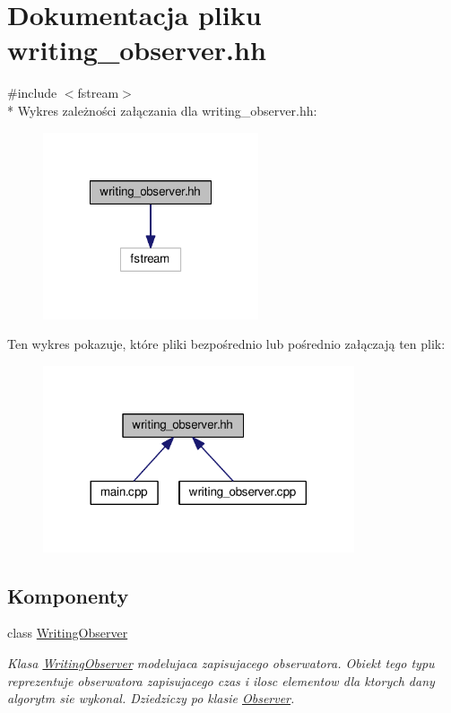 \hypertarget{writing__observer_8hh}{\section{Dokumentacja pliku writing\-\_\-observer.\-hh}
\label{writing__observer_8hh}
}
{\ttfamily \#include $<$fstream$>$}\\*
Wykres zależności załączania dla writing\-\_\-observer.\-hh\-:
\nopagebreak
\begin{figure}[H]
\begin{center}
\leavevmode
\includegraphics[width=180pt]{writing__observer_8hh__incl}
\end{center}
\end{figure}
Ten wykres pokazuje, które pliki bezpośrednio lub pośrednio załączają ten plik\-:
\nopagebreak
\begin{figure}[H]
\begin{center}
\leavevmode
\includegraphics[width=260pt]{writing__observer_8hh__dep__incl}
\end{center}
\end{figure}
\subsection*{Komponenty}
\begin{DoxyCompactItemize}
\item 
class \hyperlink{class_writing_observer}{Writing\-Observer}
\begin{DoxyCompactList}\small\item\em Klasa \hyperlink{class_writing_observer}{Writing\-Observer} modelujaca zapisujacego obserwatora. Obiekt tego typu reprezentuje obserwatora zapisujacego czas i ilosc elementow dla ktorych dany algorytm sie wykonal. Dziedziczy po klasie \hyperlink{class_observer}{Observer}. \end{DoxyCompactList}\end{DoxyCompactItemize}
